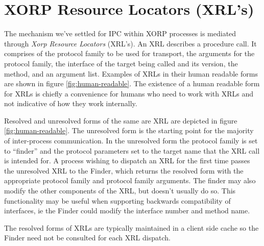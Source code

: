 \documentclass[11pt]{article}
\begin{document}
\section{XORP Resource Locators (XRL's)}

The mechanism we've settled for IPC within XORP processes is mediated
through \emph{Xorp Resource Locators} (XRL's).  An XRL describes a
procedure call.  It comprises of the protocol family to be used for
transport, the arguments for the protocol family, the interface of the
target being called and its version, the method, and an argument
list.  Examples of XRLs in their human readable forms are shown in
figure \ref{fig:human-readable}.  The existence of a human readable
form for XRLs is chiefly a convenience for humans who need to work
with XRLs and not indicative of how they work internally.

Resolved and unresolved forms of the same are XRL are depicted in
figure \ref{fig:human-readable}.  The unresolved form is the starting
point for the majority of inter-process communication.  In the
unresolved form the protocol family is set to ``finder'' and the
protocol parameters set to the target name that the XRL call is
intended for.  A process wishing to dispatch an XRL for the first time
passes the unresolved XRL to the Finder, which returns the resolved
form with the appropriate protocol family and protocol family
arguments.  The finder may also modify the other components of the
XRL, but doesn't usually do so.  This functionality may be useful when
supporting backwards compatibility of interfaces, ie the Finder could
modify the interface number and method name.

The resolved forms of XRLs are typically maintained in a client side
cache so the Finder need not be consulted for each XRL dispatch.
\end{document}
